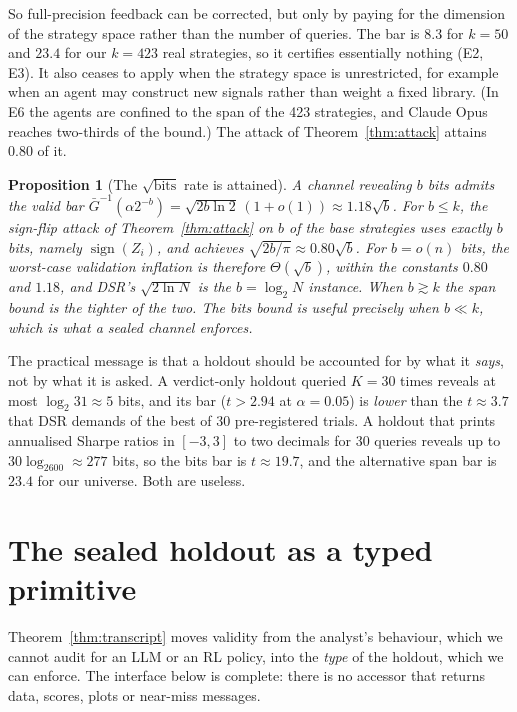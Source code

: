 \documentclass[11pt]{article}
\newtheorem{proposition}[theorem]{Proposition}
\theoremstyle{definition}
\theoremstyle{remark}
\begin{document}
So full-precision feedback can be corrected, but only by paying for the dimension of the strategy space rather than the number of queries. The bar is $8.3$ for $k=50$ and $23.4$ for our $k=423$ real strategies, so it certifies essentially nothing (E2, E3). It also ceases to apply when the strategy space is unrestricted, for example when an agent may construct new signals rather than weight a fixed library. (In E6 the agents are confined to the span of the 423 strategies, and Claude Opus reaches two-thirds of the bound.) The attack of Theorem~\ref{thm:attack} attains $0.80$ of it.

\begin{proposition}[The $\sqrt{\text{bits}}$ rate is attained]\label{prop:tight}
A channel revealing $b$ bits admits the valid bar $\bar G^{-1}(\alpha2^{-b})=\sqrt{2b\ln2}\,(1+o(1))\approx1.18\sqrt b$. For $b\le k$, the sign-flip attack of Theorem~\ref{thm:attack} on $b$ of the base strategies uses exactly $b$ bits, namely $\operatorname{sign}(Z_i)$, and achieves $\sqrt{2b/\pi}\approx0.80\sqrt b$. For $b=o(n)$ bits, the worst-case validation inflation is therefore $\Theta(\sqrt b)$, within the constants $0.80$ and $1.18$, and DSR's $\sqrt{2\ln N}$ is the $b=\log_2N$ instance. When $b\gtrsim k$ the span bound is the tighter of the two. The bits bound is useful precisely when $b\ll k$, which is what a sealed channel enforces.
\end{proposition}

The practical message is that a holdout should be accounted for by what it \emph{says}, not by what it is asked. A verdict-only holdout queried $K=30$ times reveals at most $\log_2 31\approx5$ bits, and its bar ($t>2.94$ at $\alpha=0.05$) is \emph{lower} than the $t\approx3.7$ that DSR demands of the best of 30 pre-registered trials. A holdout that prints annualised Sharpe ratios in $[-3,3]$ to two decimals for 30 queries reveals up to $30\log_2600\approx277$ bits, so the bits bar is $t\approx19.7$, and the alternative span bar is $23.4$ for our universe. Both are useless.

\section{The sealed holdout as a typed primitive}\label{sec:sealed}
Theorem~\ref{thm:transcript} moves validity from the analyst's behaviour, which we cannot audit for an LLM or an RL policy, into the \emph{type} of the holdout, which we can enforce. The interface below is complete: there is no accessor that returns data, scores, plots or near-miss messages.
\end{document}
